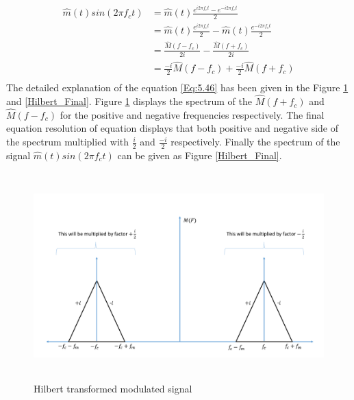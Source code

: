 \begin{equation}
\begin{split}
{\hat{m}(t)} sin(2\pi f_c t)&={\hat{m}(t)}\frac{e^{i2\pi f_c t} - e^{-i2\pi f_c t} }{2}\\
&={\hat{m}(t)}\frac{e^{i2\pi f_c t}}{2} - {\hat{m}(t)}\frac{e^{-i2\pi f_c t}}{2}\\
&={\frac{\hat{M}(f-f_c)}{2i}}-{\frac{\hat{M}(f+f_c)}{2i}}\\
&={\frac{-i}{2}\hat{M}(f-f_c)}+{\frac{-i}{2}\hat{M}(f+f_c)}\\
\end{split}
\label{Eq:5.46}
\end{equation}
The detailed explanation of the equation \ref{Eq:5.46} has been given in the Figure \ref{Hilbert_Transformed_modulated_signal} and \ref{Hilbert_Final}. Figure \ref{Hilbert_Transformed_modulated_signal} displays the spectrum of the $\hat{M}(f+f_c)$ and $\hat{M}(f-f_c)$ for the positive and negative frequencies respectively. The final equation resolution of equation displays that both positive and negative side of the spectrum multiplied with $\frac{i}{2}$ and $\frac{-i}{2}$ respectively. Finally the spectrum of the signal ${\hat{m}(t)} sin(2\pi f_c t)$ can be given as Figure \ref{Hilbert_Final}.
\begin{figure}[h]
	\centering
	\includegraphics[width=1.0\textwidth, height=8cm]{./sdf/simplified_coherent_receiver/figures/SSB4.pdf}
	\caption{Hilbert transformed modulated signal}\label{Hilbert_Transformed_modulated_signal}
\end{figure}

